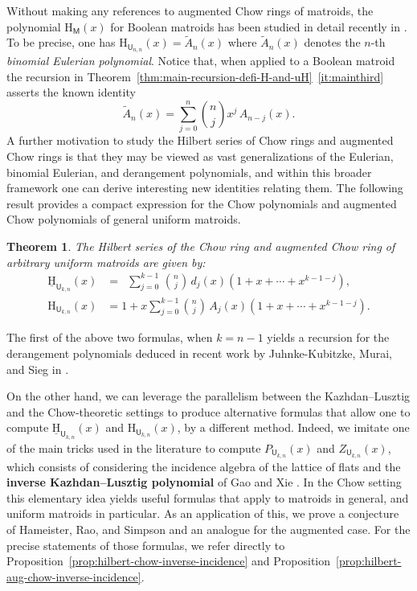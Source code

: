 \documentclass[11pt, a4paper, english]{amsart}
\theoremstyle{teoremas}
\newtheorem{theorem}{Theorem}[section]
\theoremstyle{definition}
\newcommand{\M}{\mathsf{M}}
\newcommand{\U}{\mathsf{U}}
\renewcommand{\H}{\mathrm{H}}
\newcommand{\uH}{\underline{\mathrm{H}}}
\begin{document}
Without making any references to augmented Chow rings of matroids, the polynomial $\H_{\M}(x)$ for Boolean matroids has been studied in detail recently in \cite{postnikov-reiner-williams,athanasiadis-eulerian,shareshian-wachs,haglund-zhang,binhan,branden-jochemko}. To be precise, one has $\H_{\U_{n,n}}(x)=\widetilde{A}_n(x)$ where $\widetilde{A}_n(x)$ denotes the $n$-th \emph{binomial Eulerian polynomial}. Notice that, when applied to a Boolean matroid the recursion in Theorem~\ref{thm:main-recursion-defi-H-and-uH}~\eqref{it:mainthird} asserts the known identity
    \[ \widetilde{A}_n(x) = \sum_{j=0}^n \binom{n}{j} x^j\, A_{n-j}(x).\]
A further motivation to study the Hilbert series of Chow rings and augmented Chow rings is that they may be viewed as vast generalizations of the Eulerian, binomial Eulerian, and derangement polynomials, and within this broader framework one can derive  interesting new identities relating them. The following result provides a compact expression for the Chow polynomials and augmented Chow polynomials of general uniform matroids.

\begin{theorem}\label{thm:uniform-formulas-main}
    The Hilbert series of the Chow ring and augmented Chow ring of arbitrary uniform matroids are given by:
    \begin{align*}
        \uH_{\U_{k,n}}(x) &= \enspace \sum_{j=0}^{k-1}\, \binom{n}{j} \, d_j(x) (1+x+\cdots+x^{k-1-j}),\\
        \H_{\U_{k,n}}(x) &= 1 + x\sum_{j=0}^{k-1} \binom{n}{j}\, A_j(x) (1+x+\cdots+x^{k-1-j}).
    \end{align*}
\end{theorem}

The first of the above two formulas, when $k=n-1$ yields a recursion for the derangement polynomials deduced in recent work by Juhnke-Kubitzke, Murai, and Sieg in \cite[Corollary~4.2]{juhnke-murai-sieg}.

On the other hand, we can leverage the parallelism between the Kazhdan--Lusztig and the Chow-theoretic settings to produce alternative formulas that allow one to compute $\uH_{\U_{k,n}}(x)$ and $\H_{\U_{k,n}}(x)$, by a different method. Indeed, we imitate one of the main tricks used in the literature to compute $P_{\U_{k,n}}(x)$ and $Z_{\U_{k,n}}(x)$, which consists of considering the incidence algebra of the lattice of flats and the \textbf{inverse Kazhdan--Lusztig polynomial} of Gao and Xie \cite{gao-xie}. In the Chow setting this elementary idea yields useful formulas that apply to matroids in general, and uniform matroids in particular. As an application of this, we prove a conjecture of Hameister, Rao, and Simpson \cite[Conjecture 6.2]{hameister-rao-simpson} and an analogue for the augmented case. For the precise statements of those formulas, we refer directly to Proposition~\ref{prop:hilbert-chow-inverse-incidence} and Proposition~\ref{prop:hilbert-aug-chow-inverse-incidence}. 
\end{document}
